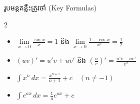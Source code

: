 \documentclass[theme=teal,margin=normal,11pt]{khmermath}
\begin{document}

	\begin{formulabox}{រូបមន្តគន្លឹះត្រូវចាំ (Key Formulas)}
		\begin{multicols}{2}
			\begin{itemize}[leftmargin=15pt, itemsep=2pt]
				\item $\lim\limits_{x \to 0} \frac{\sin x}{x} = 1$ \quad និង \quad $\lim\limits_{x \to 0} \frac{1 - \cos x}{x^2} = \frac{1}{2}$
				\item $(uv)' = u'v + uv'$ \quad និង \quad $\left(\frac{u}{v}\right)' = \frac{u'v - uv'}{v^2}$
				\item $\int x^n \, dx = \frac{x^{n+1}}{n+1} + c \quad (n \neq -1)$
				\item $\int e^{ax} \, dx = \frac{1}{a} e^{ax} + c$
			\end{itemize}
		\end{multicols}
	\end{formulabox}

	\vspace{4pt}
\end{document}
